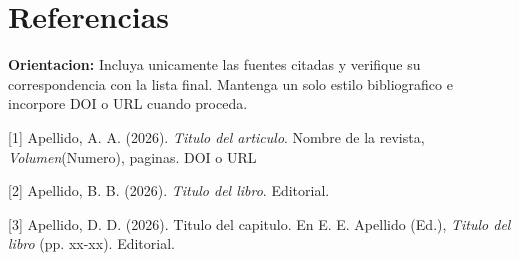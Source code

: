 \documentclass[11pt,a4paper]{article}
\begin{document}
\vspace{10pt}

\section{Referencias}

\begin{orientation}
    \textbf{Orientacion:} Incluya unicamente las fuentes citadas y verifique su correspondencia con la lista final. Mantenga un solo estilo bibliografico e incorpore DOI o URL cuando proceda.
\end{orientation}

\vspace{8pt}

[1] Apellido, A. A. (2026). \textit{Titulo del articulo}. Nombre de la revista, \textit{Volumen}(Numero), paginas. DOI o URL

[2] Apellido, B. B. (2026). \textit{Titulo del libro}. Editorial.

[3] Apellido, D. D. (2026). Titulo del capitulo. En E. E. Apellido (Ed.), \textit{Titulo del libro} (pp. xx-xx). Editorial.
\end{document}
